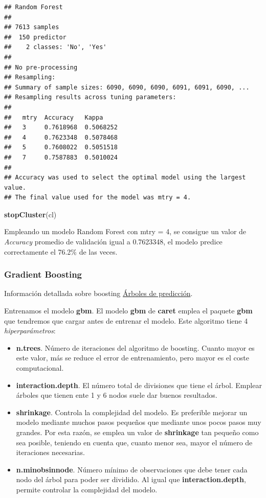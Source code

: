 \documentclass[]{article}
\newenvironment{Shaded}{\begin{snugshade}}{\end{snugshade}}
\newcommand{\KeywordTok}[1]{\textcolor[rgb]{0.13,0.29,0.53}{\textbf{#1}}}
\newcommand{\NormalTok}[1]{#1}
\begin{document}
\begin{verbatim}
## Random Forest 
## 
## 7613 samples
##  150 predictor
##    2 classes: 'No', 'Yes' 
## 
## No pre-processing
## Resampling: 
## Summary of sample sizes: 6090, 6090, 6090, 6091, 6091, 6090, ... 
## Resampling results across tuning parameters:
## 
##   mtry  Accuracy   Kappa    
##   3     0.7618968  0.5068252
##   4     0.7623348  0.5078468
##   5     0.7608022  0.5051518
##   7     0.7587883  0.5010024
## 
## Accuracy was used to select the optimal model using the largest value.
## The final value used for the model was mtry = 4.
\end{verbatim}

\begin{Shaded}
\begin{Highlighting}[]
\KeywordTok{stopCluster}\NormalTok{(cl)}
\end{Highlighting}
\end{Shaded}

Empleando un modelo Random Forest con mtry = 4, se consigue un
valor de \emph{Accuracy} promedio de validación igual a 0.7623348, el modelo
predice correctamente el 76.2\% de las veces.

\newpage

\hypertarget{gradient-boosting}{%
\subsubsection{Gradient Boosting}\label{gradient-boosting}}

Información detallada sobre boosting
\href{https://www.cienciadedatos.net/documentos/33_arboles_de_prediccion_bagging_random_forest_boosting}{\color{blue}Árboles
de predicción}.

Entrenamos el modelo \textbf{gbm}. El modelo \textbf{gbm} de \textbf{caret} emplea el paquete \textbf{gbm} que tendremos que cargar antes de entrenar el modelo. Este
algoritmo tiene 4 \emph{hiperparámetros}:

\begin{itemize}
\item
\textbf{n.trees}. Número de iteraciones del algoritmo de boosting.
Cuanto mayor es este valor, más se reduce el error de entrenamiento, pero mayor es el coste computacional.
\item

  \textbf{interaction.depth}. El número total de divisiones que tiene el
  árbol. Emplear árboles que tienen ente 1 y 6 nodos suele dar buenos
  resultados.
\item
  \textbf{shrinkage}. Controla la complejidad del modelo. Es
  preferible mejorar un modelo mediante muchos pasos pequeños que
  mediante unos pocos pasos muy grandes. Por esta razón, se emplea un valor de
  \textbf{shrinkage} tan pequeño como sea posible, teniendo en cuenta
  que, cuanto menor sea, mayor el número de iteraciones necesarias. 
\item
  \textbf{n.minobsinnode}. Número mínimo de observaciones que debe tener
  cada nodo del árbol para poder ser dividido. Al igual que
  \textbf{interaction.depth}, permite controlar la complejidad del modelo.
\end{itemize}
\end{document}
